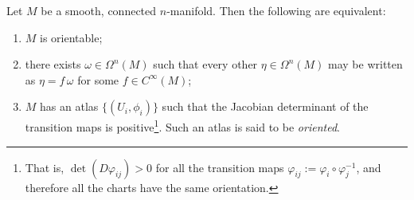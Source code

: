 \begin{proposition}\label{prop:orientable}
  Let $M$ be a smooth, connected $n$-manifold.
  Then the following are equivalent:
  \begin{enumerate}
    \item $M$ is orientable;
    \item there exists $\omega\in\Omega^n(M)$ such that every other $\eta\in\Omega^n(M)$ may be written as $\eta = f\,\omega$ for some $f\in C^\infty(M)$;
    \item $M$ has an atlas $\{(U_i, \phi_i)\}$ such that the Jacobian determinant of the transition maps is positive\footnote{That is, $\det(D\varphi_{ij}) > 0$ for all the transition maps $\varphi_{ij} := \varphi_i\circ\varphi_j^{-1}$, and therefore all the charts have the same orientation.}. Such an atlas is said to be \emph{oriented}.
  \end{enumerate}
\end{proposition}
